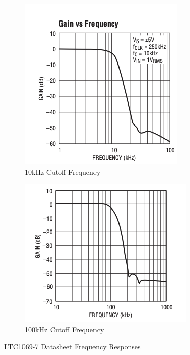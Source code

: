 \begin{figure}[H]
    \centering
    \begin{subfigure}[b]{0.4\textwidth}
        \centering
        \includegraphics[width=\textwidth]{LTC_10k.png}
        \caption{10kHz Cutoff Frequency}
        \label{fig:ltc_10k}
    \end{subfigure}\hfill
    \begin{subfigure}[b]{0.4\textwidth}
        \centering
        \includegraphics[width=\textwidth]{LTC_100k.png}
        \caption{100kHz Cutoff Frequency}
        \label{fig:ltc_100k}
    \end{subfigure}
    \caption{LTC1069-7 Datasheet Frequency Responses}
    \label{fig:ltc_aa_freq}
\end{figure}

